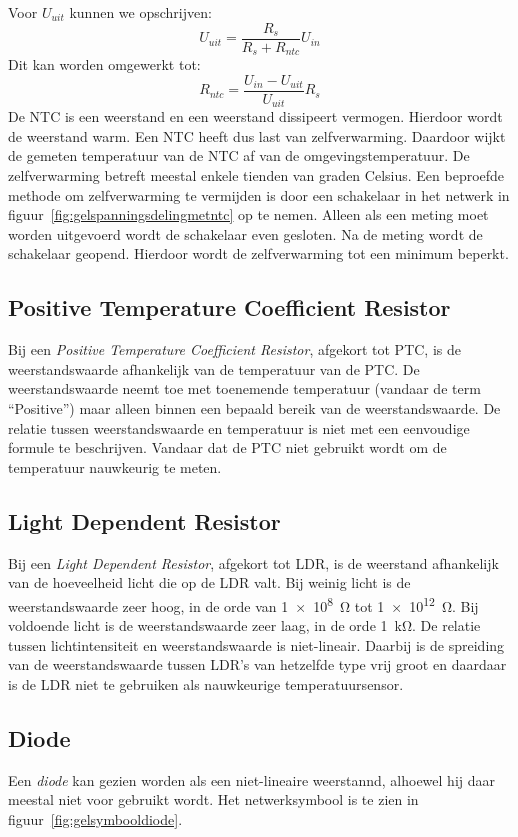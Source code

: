 Voor $U_{uit}$ kunnen we opschrijven:
%
\begin{equation}
U_{uit} = \dfrac{R_s}{R_s+R_{ntc}}U_{in}
\end{equation}
%
Dit kan worden omgewerkt tot:
%
\begin{equation}
R_{ntc} = \dfrac{U_{in}-U_{uit}}{U_{uit}}R_s
\end{equation}
%
De NTC is een weerstand en een weerstand dissipeert vermogen. Hierdoor wordt de weerstand warm. Een NTC heeft dus last van zelfverwarming. Daardoor wijkt de gemeten temperatuur van de NTC af van de omgevingstemperatuur. De zelfverwarming betreft meestal enkele tienden van graden Celsius. Een beproefde methode om zelfverwarming te vermijden is door een schakelaar in het netwerk in figuur~\ref{fig:gelspanningsdelingmetntc} op te nemen. Alleen als een meting moet worden uitgevoerd wordt de schakelaar even gesloten. Na de meting wordt de schakelaar geopend. Hierdoor wordt de zelfverwarming tot een minimum beperkt.

\subsection{Positive Temperature Coefficient Resistor}
Bij een \textsl{Positive Temperature Coefficient Resistor}, afgekort tot PTC, is de weerstandswaarde afhankelijk van de temperatuur van de PTC. De weerstandswaarde neemt toe met toenemende temperatuur (vandaar de term ``Positive'') maar alleen binnen een bepaald bereik van de weerstandswaarde. De relatie tussen weerstandswaarde en temperatuur is niet met een eenvoudige formule te beschrijven. Vandaar dat de PTC niet gebruikt wordt om de temperatuur nauwkeurig te meten.

\subsection{Light Dependent Resistor}
Bij een \textsl{Light Dependent Resistor}, afgekort tot LDR, is de weerstand afhankelijk van de hoeveelheid licht die op de LDR valt. Bij weinig licht is de weerstandswaarde zeer hoog, in de orde van \SI{1e8}{\ohm} tot \SI{1e12}{\ohm}. Bij voldoende licht is de weerstandswaarde zeer laag, in de orde \SI{1}{\kilo\ohm}. De relatie tussen lichtintensiteit en weerstandswaarde is niet-lineair. Daarbij is de spreiding van de weerstandswaarde tussen LDR's van hetzelfde type vrij groot en daardaar is de LDR niet te gebruiken als nauwkeurige temperatuursensor.

\subsection{Diode}
Een \textsl{diode} kan gezien worden als een niet-lineaire weerstannd, alhoewel hij daar meestal niet voor gebruikt wordt. Het netwerksymbool is te zien in figuur~\ref{fig:gelsymbooldiode}.

